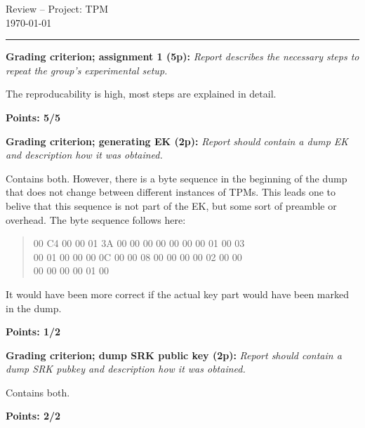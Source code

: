 \documentclass{article}
\newcommand{\grade}[5]{
  \textbf{Grading criterion; #1 (#3p):}\textit{#4}

  #5
  \hfill
  \begin{varwidth}{\linewidth}
    \textbf{Points: #2/#3}
  \end{varwidth}
}
\begin{document}
  \begin{center}
    \huge{Review -- Project: TPM} \\
    \vspace{0.2cm}
    \Large{\today}
    \vspace{0.4cm}
    \hrule
  \end{center}

  \grade{assignment 1}{5}{5}
  {
    Report describes the necessary steps to repeat the group's
    experimental setup.
  }
  {
    The reproducability is high, most steps are explained in detail.
  }

  \grade{generating EK}{1}{2}
  {
    Report should contain a dump EK and description how it was obtained.
  }
  {
    Contains both. However, there is a byte sequence in the beginning of the dump that does not change between different instances of TPMs. This leads one to belive that this sequence is not part of the EK, but some sort of preamble or overhead. 
The byte sequence follows here: 
\begin{quote}
00 C4 00 00 01 3A 00 00 00 00 00 00 00 01 00 03 \\
00 01 00 00 00 0C 00 00 08 00 00 00 00 02 00 00 \\
00 00 00 00 01 00
\end{quote}

It would have been more correct if the actual key part would have been marked in the dump.
  }

  \grade{dump SRK public key}{2}{2}
  {
    Report should contain a dump SRK pubkey and description how it was
    obtained.
  }
  {
    Contains both.
  }
\end{document}
